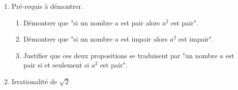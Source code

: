 
\begin{enumerate}
\item Pré-requis à démontrer.
	\begin{enumerate}
	\item Démontrer que "si un nombre $a$ est pair alors $a^2$ est pair".
	\item Démontrer que "si un nombre $a$ est impair alors $a^2$ est impair".
	\item Justifier que ces deux propositions se traduisent par "un nombre $a$ est pair si et seulement si $a^2$ est pair".
	\end{enumerate}
\item Irrationalité de $\sqrt{2}$
\end{enumerate}
